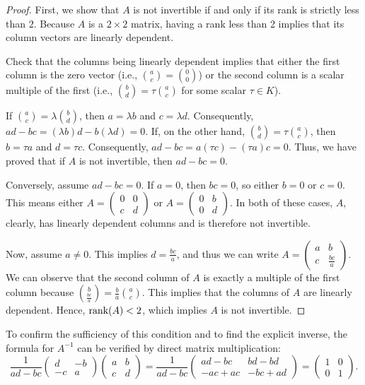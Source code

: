 \begin{proof}
  First, we show that $A$ is not invertible if and only if its rank is strictly less than $2$. Because $A$ is a $2 \times 2$ matrix, having a rank less than 2 implies that its column vectors are linearly dependent.

  \begin{remark}[Exercise]\label{rem:lin_dep_2x2_exercise}
    Check that the columns being linearly dependent implies that either the first column is the zero vector (i.e., $\binom{a}{c} = \binom{0}{0}$) or the second column is a scalar multiple of the first (i.e., $\binom{b}{d} = \tau \binom{a}{c}$ for some scalar $\tau \in K$).
  \end{remark}

  If $\binom{a}{c} = \lambda \binom{b}{d}$, then $a = \lambda b$ and $c = \lambda d$. Consequently, $ad - bc = (\lambda b)d - b(\lambda d) = 0$.
  If, on the other hand, $\binom{b}{d} = \tau \binom{a}{c}$, then $b = \tau a$ and $d = \tau c$. Consequently, $ad - bc = a(\tau c) - (\tau a)c = 0$.
  Thus, we have proved that if $A$ is not invertible, then $ad - bc = 0$.

  Conversely, assume $ad - bc = 0$. If $a = 0$, then $bc = 0$, so either $b = 0$ or $c = 0$. This means either $A = \left(\begin{smallmatrix} 0 & 0 \\ c & d \end{smallmatrix}\right)$ or $A = \left(\begin{smallmatrix} 0 & b \\ 0 & d \end{smallmatrix}\right)$. In both of these cases, $A$, clearly, has linearly dependent columns and is therefore not invertible.

  Now, assume $a \neq 0$. This implies $d = \frac{bc}{a}$, and thus we can write $A = \left(\begin{smallmatrix} a & b \\ c & \frac{bc}{a} \end{smallmatrix}\right)$. We can observe that the second column of $A$ is exactly a multiple of the first column because $\binom{b}{\frac{bc}{a}} = \frac{b}{a} \binom{a}{c}$. This implies that the columns of $A$ are linearly dependent. Hence, $\operatorname{rank}(A) < 2$, which implies $A$ is not invertible.
\end{proof}

To confirm the sufficiency of this condition and to find the explicit inverse, the formula for $A^{-1}$ can be verified by direct matrix multiplication:
\[
\frac{1}{ad-bc} \begin{pmatrix} d & -b \\ -c & a \end{pmatrix} \begin{pmatrix} a & b \\ c & d \end{pmatrix} = \frac{1}{ad-bc} \begin{pmatrix} ad-bc & bd-bd \\ -ac+ac & -bc+ad \end{pmatrix} = \begin{pmatrix} 1 & 0 \\ 0 & 1 \end{pmatrix}.
\]

